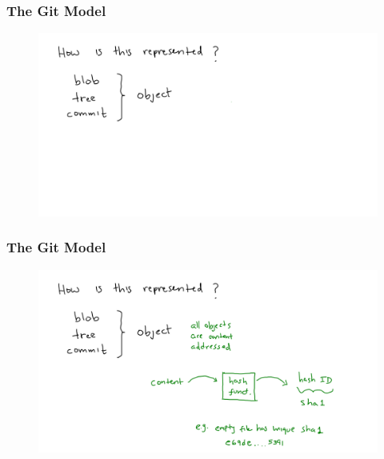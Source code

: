 \documentclass[11pt]{beamer}
\begin{document}
\begin{frame}[fragile]
\frametitle{The Git Model}

\begin{figure}[htp]
 \centering
 \includegraphics[scale=0.2]{git_model3a.png}
\end{figure}

\end{frame}




\begin{frame}[fragile]
\frametitle{The Git Model}

\begin{figure}[htp]
 \centering
 \includegraphics[scale=0.2]{git_model3b.png}
\end{figure}

\end{frame}



\end{document}
